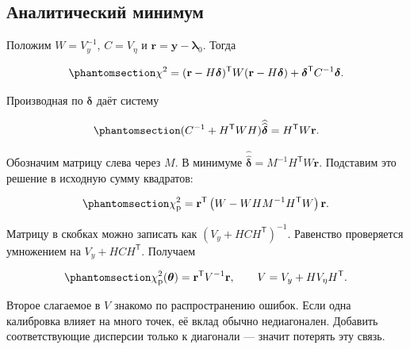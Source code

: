 \documentclass[
  russian,
  11pt,
  a4paper,
  open=any]{scrbook}
\begin{document}
\begin{bookderivation}

\subsection{Аналитический
минимум}\label{ux430ux43dux430ux43bux438ux442ux438ux447ux435ux441ux43aux438ux439-ux43cux438ux43dux438ux43cux443ux43c}

Положим \(W=V_y^{-1}\), \(C=V_\eta\) и
\(\mathbf r=\mathbf y-\boldsymbol\lambda_0\). Тогда

\begin{equation}\protect\phantomsection\label{eq-ch12-linear-penalty}{
\chi^2=(\mathbf r-H\boldsymbol\delta)^{\mathsf T}
W(\mathbf r-H\boldsymbol\delta)
+\boldsymbol\delta^{\mathsf T}C^{-1}\boldsymbol\delta.
}\end{equation}

Производная по \(\boldsymbol\delta\) даёт систему

\begin{equation}\protect\phantomsection\label{eq-ch12-nuisance-normal-equations}{
(C^{-1}+H^{\mathsf T}WH)\widehat{\widehat{\boldsymbol\delta}}
=H^{\mathsf T}W\mathbf r.
}\end{equation}

Обозначим матрицу слева через \(M\). В минимуме
\(\widehat{\widehat{\boldsymbol\delta}}=M^{-1}H^{\mathsf T}W\mathbf r\).
Подставим это решение в исходную сумму квадратов:

\begin{equation}\protect\phantomsection\label{eq-ch12-profile-after-substitution}{
\chi^2_{\mathrm p}
=\mathbf r^{\mathsf T}
\left(W-WHM^{-1}H^{\mathsf T}W\right)\mathbf r.
}\end{equation}

Матрицу в скобках можно записать как \((V_y+HCH^{\mathsf T})^{-1}\).
Равенство проверяется умножением на \(V_y+HCH^{\mathsf T}\). Получаем

\begin{equation}\protect\phantomsection\label{eq-ch12-effective-covariance}{
\chi^2_{\mathrm p}(\boldsymbol\theta)
=\mathbf r^{\mathsf T}V^{-1}\mathbf r,
\qquad
V=V_y+HV_\eta H^{\mathsf T}.
}\end{equation}

\end{bookderivation}

Второе слагаемое в \(V\) знакомо по распространению ошибок. Если одна
калибровка влияет на много точек, её вклад обычно недиагонален. Добавить
соответствующие дисперсии только к диагонали --- значит потерять эту
связь.
\end{document}
